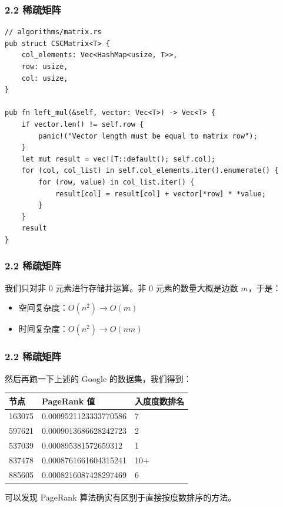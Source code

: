 \documentclass{beamer}
\begin{document}
\begin{frame}[fragile]
	\frametitle{2.2 稀疏矩阵}
\begin{lstlisting}
// algorithms/matrix.rs
pub struct CSCMatrix<T> {
    col_elements: Vec<HashMap<usize, T>>,
    row: usize,
    col: usize,
}

pub fn left_mul(&self, vector: Vec<T>) -> Vec<T> {
    if vector.len() != self.row {
        panic!("Vector length must be equal to matrix row");
    }
    let mut result = vec![T::default(); self.col];
    for (col, col_list) in self.col_elements.iter().enumerate() {
        for (row, value) in col_list.iter() {
            result[col] = result[col] + vector[*row] * *value;
        }
    }
    result
}
\end{lstlisting}
\end{frame}

\begin{frame}
	\frametitle{2.2 稀疏矩阵}
	我们只对非 \(0\) 元素进行存储并运算。非 \(0\) 元素的数量大概是边数 \(m\)，于是：
	\begin{itemize}
		\item 空间复杂度：\(O(n^2)\rightarrow O(m)\)
		\item 时间复杂度：\(O(n^2)\rightarrow O(nm)\)
	\end{itemize}
\end{frame}

\begin{frame}
	\frametitle{2.2 稀疏矩阵}

	然后再跑一下上述的 Google 的数据集，我们得到：

	\begin{tabular}{lll}
		\toprule
		节点 & PageRank 值 & 入度度数排名 \\
		\midrule
		163075 & 0.0009521123333770586 & 7 \\
		597621 & 0.0009013686628242723 & 2 \\
		537039 & 0.000895381572659312 & 1 \\
		837478 & 0.0008761661604315241 & 10+ \\
		885605 & 0.0008216087428297469 & 6 \\
		\bottomrule
	\end{tabular}

	\pause

	可以发现 PageRank 算法确实有区别于直接按度数排序的方法。
\end{frame}
\end{document}
